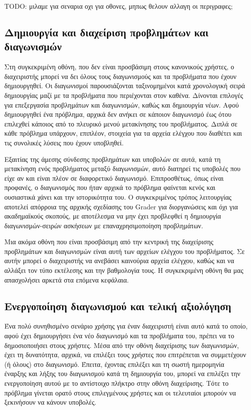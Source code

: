 \documentclass[diploma]{softlab-thesis}
\begin{document}
TODO: μιλαμε για σεναρια οχι για οθονες, μηπως θελουν αλλαγη οι περιγραφες;
\subsection{Δημιουργία και διαχείριση προβλημάτων και διαγωνισμών}

Στη συγκεκριμένη οθόνη, που δεν είναι προσβάσιμη στους κανονικούς χρήστες, ο
διαχειριστής μπορεί να δει όλους τους διαγωνισμούς και τα προβλήματα που έχουν
δημιουργηθεί. Οι διαγωνισμοί παρουσιάζονται ταξινομημένοι κατά χρονολογική
σειρά δημιουργίας μαζί με τα προβλήματα που περιέχονται στον καθένα. Δίνονται
επιλογές για επεξεργασία προβλημάτων και διαγωνισμών, καθώς και δημιουργία
νέων. Αφού δημιουργηθεί ένα πρόβλημα, αρχικά δεν ανήκει σε κάποιον διαγωνισμό
έως ότου επιλεχθεί κάποιος από το πλευρικό μενού μετακίνησης του προβλήματος.
Διπλά σε κάθε πρόβλημα υπάρχουν, επιπλέον, στοιχεία για τα αρχεία ελέγχου που
διαθέτει και τις συνολικές λύσεις που έχουν υποβληθεί.

\bigskip

Εξαιτίας της άμεσης σύνδεσης προβλημάτων και υποβολών σε αυτά, κατά τη
μετακίνηση ενός προβλήματος μεταξύ διαγωνισμών, αυτό διατηρεί τις υποβολές που
είχε αν και είναι πλέον σε διαφορετικό διαγωνισμό. Επιπροσθέτως, όπως είναι
προφανές, ο διαγωνισμός που ήταν αρχικά το πρόβλημα φαίνεται κενός και
ουσιαστικά χάνει και την ιστορικότητα του. Ο συγκεκριμένος τρόπος λειτουργίας
αποτελεί απόρροια της αρχικής σχεδίασης του Grader για διοργανώσεις και όχι για
ακαδημαϊκούς σκοπούς, με αποτέλεσμα να μην έχει προβλεφθεί η δημιουργία
διαγωνισμών-σειρών ασκήσεων με επαναχρησιμοποίηση προβλημάτων.

\bigskip

Μια ακόμα οθόνη που είναι προσβάσιμη από την κεντρική της διαχείρισης προβλημάτων
και διαγωνισμών είναι αυτή των αρχείων ελέγχου του προβλήματος. Σε αυτήν μπορεί
ο διαχειριστής να ανεβάσει καινούρια αρχεία ελέγχου, καθώς και να αλλάξει τον τύπο
εκτέλεσης και την βαθμολογία τους. Η συγκεκριμένη οθόνη θα μας απασχολήσει αρκετά
στα επόμενα κεφάλαια.

\subsection{Ενεργοποίηση διαγωνισμού και τελική αξιολόγηση}

Ένα πολύ συνηθισμένο σενάριο χρήσης για έναν διαχειριστή είναι αυτό κατά το
οποίο, αφού έχει δημιουργήσει ένα νέο διαγωνισμό και τα προβλήματα του, πρέπει
να το δημοσιοποιήσει στους χρήστες. Μέσα από την οθόνη διαχείρισης των
διαγωνισμών, έχει τη δυνατότητα, αρχικά, να επιλέξει τους χρήστες που
επιτρέπεται να συμμετέχουν (ή όλους) στο διαγωνισμό. Έπειτα, έχοντας επιλέξει
και τη σωστή ημερομηνία έναρξης και λήξης του διαγωνισμού κατά τη δημιουργία
του, μπορεί να επιλέξει την ενεργοποίηση αυτού με το αντίστοιχο πλήκτρο στην
οθόνη διαχείρισης. Τότε το πρόβλημα γίνεται ορατό στους επιλεγμένους χρήστες
και οι τελευταίοι μπορούν να ξεκινήσουν να κάνουν υποβολές.
\end{document}
